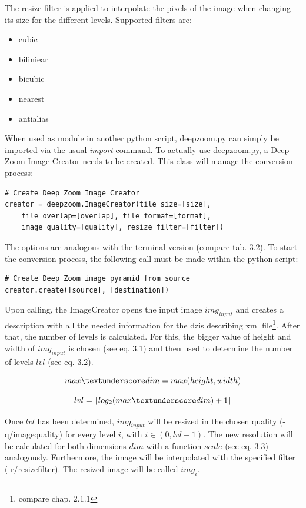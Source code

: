 The resize filter is applied to interpolate the pixels of the image when changing its size for the different levels. Supported filters are:

\begin{itemize}
	\item cubic
	\item biliniear
	\item bicubic
	\item nearest
	\item antialias
\end{itemize}

When used as module in another python script, deepzoom.py can simply be imported via the usual \emph{import} command. To actually use deepzoom.py, a Deep Zoom Image Creator needs to be created. This class will manage the conversion process:

\begin{lstlisting}[frame=single]
# Create Deep Zoom Image Creator
creator = deepzoom.ImageCreator(tile_size=[size], 
	tile_overlap=[overlap],	tile_format=[format], 
	image_quality=[quality], resize_filter=[filter])
\end{lstlisting}

The options are analogous with the terminal version (compare tab. 3.2). To start the conversion process, the following call must be made within the python script:

\begin{lstlisting}[frame=single]
# Create Deep Zoom image pyramid from source
creator.create([source], [destination])
\end{lstlisting}

Upon calling, the ImageCreator opens the input image $img_{input}$ and creates a description with all the needed information for the dzis describing xml file\footnote{compare chap. 2.1.1}. After that, the number of levels is calculated. For this, the bigger value of height and width of $img_{input}$ is chosen (see eq. 3.1) and then used to determine the number of levels $lvl$ (see eq. 3.2).

\begin{equation}
	max{\textunderscore}dim = max(height, width)
\end{equation}

\begin{equation}
	lvl = {\lceil}log_2(max{\textunderscore}dim) + 1\rceil
\end{equation}

Once $lvl$ has been determined, $img_{input}$ will be resized in the chosen quality (-q/image{\textunderscore}quality) for every level $i$, with $i \in (0, lvl-1)$. The new resolution will be calculated for both dimensions $dim$ with a function $scale$ (see eq. 3.3) analogously. Furthermore, the image will be interpolated with the specified filter (-r/resize{\textunderscore}filter). The resized image will be called $img_i$.

